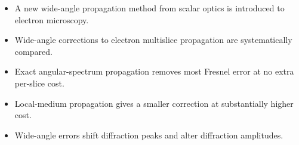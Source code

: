 \begin{itemize}
\item A new wide-angle propagation method from scalar optics is introduced to electron microscopy.
\item Wide-angle corrections to electron multislice propagation are systematically compared.
\item Exact angular-spectrum propagation removes most Fresnel error at no extra per-slice cost.
\item Local-medium propagation gives a smaller correction at substantially higher cost.
\item Wide-angle errors shift diffraction peaks and alter diffraction amplitudes.
\end{itemize}
